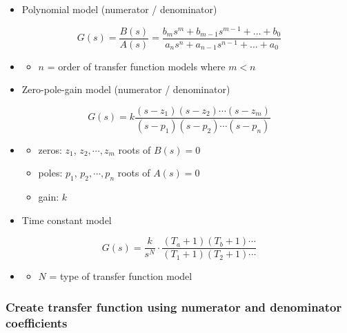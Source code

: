 \documentclass[12pt,letter]{article}
\begin{document}
\begin{itemize}[noitemsep,topsep=0pt]
	\item Polynomial model (numerator / denominator)
\end{itemize}
\begin{equation}
	G(s) = \frac{B(s)}{A(s)} = \frac{b_ms^m + b_{m-1}s^{m-1} + ... + b_0}{a_ns^n + a_{n-1}s^{n-1} + ... + a_0}
\end{equation}
\begin{itemize}[noitemsep,topsep=0pt]
\item[]
	\begin{itemize}[noitemsep,topsep=0pt]
		\item $n$ = order of transfer function models where $m <n$
	\end{itemize}
	\item Zero-pole-gain model (numerator / denominator)
\end{itemize}
\begin{equation}
	G(s) = k \frac{(s-z_1)(s-z_2)\cdots (s-z_m)}{(s-p_1)(s-p_2)\cdots (s-p_n)}
\end{equation}
\begin{itemize}[noitemsep,topsep=0pt]
\item[]
\begin{itemize}[noitemsep,topsep=0pt]
	\item zeros: $z_1$, $z_2, \cdots, z_m$ roots of $B(s)=0$ 
	\item poles: $p_1$, $p_2, \cdots, p_n$ roots of $A(s)=0$ 
	\item gain: $k$
\end{itemize}
\item Time constant model
\end{itemize}
 \begin{equation}
G(s) = \frac{k}{s^N} \cdot \frac{(T_a + 1)(T_b + 1)\cdots}{(T_1 + 1)(T_2 + 1)\cdots}
\end{equation}
\begin{itemize}[noitemsep,topsep=0pt]
\item[] \begin{itemize}[noitemsep,topsep=0pt]
\item $N$ = type of transfer function model
\end{itemize}
\end{itemize}

\subsubsection{Create transfer function using numerator and denominator coefficients}
\end{document}
